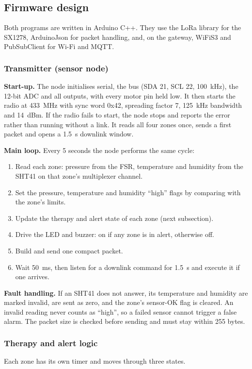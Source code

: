 \subsection{Firmware design}
Both programs are written in Arduino C++. They use the LoRa library for the SX1278, ArduinoJson for packet handling, and, on the gateway, WiFiS3 and PubSubClient for Wi-Fi and MQTT.

\subsubsection{Transmitter (sensor node)}
\textbf{Start-up.} The node initialises serial, the \itwoc{} bus (SDA 21, SCL 22, 100~kHz), the 12-bit ADC and all outputs, with every motor pin held low. It then starts the radio at 433~MHz with sync word 0x42, spreading factor 7, 125~kHz bandwidth and 14~dBm. If the radio fails to start, the node stops and reports the error rather than running without a link. It reads all four zones once, sends a first packet and opens a 1.5~s downlink window.

\textbf{Main loop.} Every 5 seconds the node performs the same cycle:
\begin{enumerate}
\item Read each zone: pressure from the FSR, temperature and humidity from the SHT41 on that zone's multiplexer channel.
\item Set the pressure, temperature and humidity ``high'' flags by comparing with the zone's limits.
\item Update the therapy and alert state of each zone (next subsection).
\item Drive the LED and buzzer: on if any zone is in alert, otherwise off.
\item Build and send one compact packet.
\item Wait 50~ms, then listen for a downlink command for 1.5~s and execute it if one arrives.
\end{enumerate}
\textbf{Fault handling.} If an SHT41 does not answer, its temperature and humidity are marked invalid, are sent as zero, and the zone's sensor-OK flag is cleared. An invalid reading never counts as ``high'', so a failed sensor cannot trigger a false alarm. The packet size is checked before sending and must stay within 255 bytes.

\subsubsection{Therapy and alert logic}
Each zone has its own timer and moves through three states.


